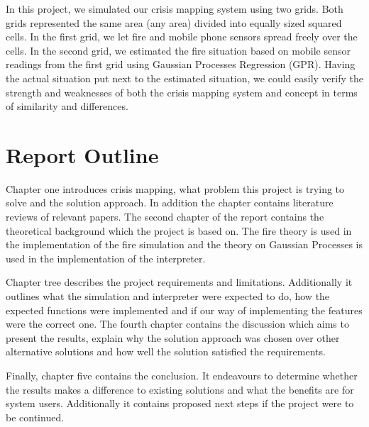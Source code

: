 In this project, we simulated our crisis mapping system using two grids. Both grids represented the same area (any area) divided into equally sized squared cells. In the first grid, we let fire and mobile phone sensors spread freely over the cells. In the second grid, we estimated the fire situation based on mobile sensor readings from the first grid using Gaussian Processes Regression (GPR). Having the actual situation put next to the estimated situation, we could easily verify the strength and weaknesses of both the crisis mapping system and concept in terms of similarity and differences.

\section{Report Outline}

Chapter one introduces crisis mapping, what problem this project is trying to solve and the solution approach. In addition the chapter contains literature reviews of relevant papers. The second chapter of the report contains the theoretical background which the project is based on. The fire theory is used in the implementation of the fire simulation and the theory on Gaussian Processes is used in the implementation of the interpreter.

Chapter tree describes the project requirements and limitations. Additionally it outlines what the simulation and interpreter were expected to do, how the expected functions were implemented and if our way of implementing the features were the correct one. The fourth chapter contains the discussion which aims to present the results, explain why the solution approach was chosen over other alternative solutions and how well the solution satisfied the requirements.

Finally, chapter five contains the conclusion. It endeavours to determine whether the results makes a difference to existing solutions and what the benefits are for system users. Additionally it contains proposed next steps if the project were to be continued.